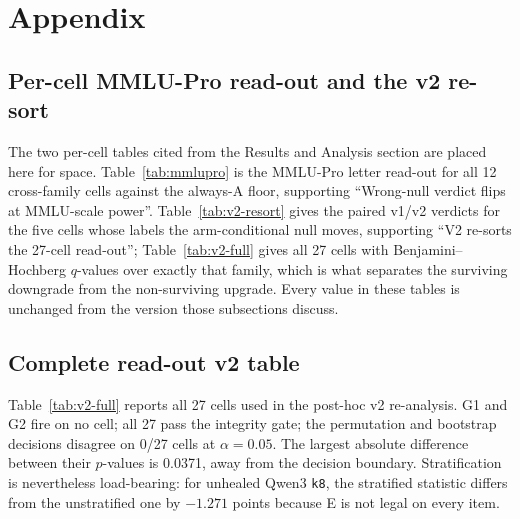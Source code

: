 \section{Appendix}




\subsection{Per-cell MMLU-Pro read-out and the v2 re-sort}
\label{app:mmlupro-and-resort}

The two per-cell tables cited from the Results and Analysis section are placed here
for space. Table~\ref{tab:mmlupro} is the MMLU-Pro letter read-out for all 12
cross-family cells against the always-A floor, supporting
``Wrong-null verdict flips at MMLU-scale power''. Table~\ref{tab:v2-resort} gives the
paired v1/v2 verdicts for the five cells whose labels the arm-conditional null moves,
supporting ``V2 re-sorts the 27-cell read-out''; Table~\ref{tab:v2-full} gives all 27
cells with Benjamini--Hochberg $q$-values over exactly that family, which is what
separates the surviving downgrade from the non-surviving upgrade. Every value in these
tables is unchanged from the version those subsections discuss.



\FloatBarrier



\FloatBarrier

\subsection{Complete read-out v2 table}

Table~\ref{tab:v2-full} reports all 27 cells used in the post-hoc v2 re-analysis. G1 and G2 fire on no cell; all 27 pass the integrity gate; the permutation and bootstrap decisions disagree on 0/27 cells at $\alpha=0.05$. The largest absolute difference between their $p$-values is 0.0371, away from the decision boundary. Stratification is nevertheless load-bearing: for unhealed Qwen3 \texttt{k8}, the stratified statistic differs from the unstratified one by $-1.271$ points because E is not legal on every item.


